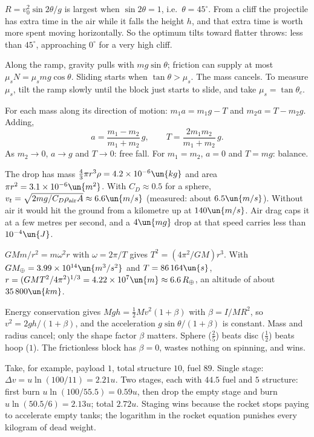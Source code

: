 
 $R = v_0^2\sin2\theta/g$ is largest when $\sin2\theta = 1$, i.e.\ $\theta = 45^\circ$. From a cliff the projectile has extra time in the air while it falls the height $h$, and that extra time is worth more spent moving horizontally. So the optimum tilts toward flatter throws: less than $45^\circ$, approaching $0^\circ$ for a very high cliff.

 Along the ramp, gravity pulls with $mg\sin\theta$; friction can supply at most $\mu_sN = \mu_smg\cos\theta$. Sliding starts when $\tan\theta>\mu_s$. The mass cancels. To measure $\mu_s$, tilt the ramp slowly until the block just starts to slide, and take $\mu_s = \tan\theta_c$.

 For each mass along its direction of motion: $m_1a = m_1g - T$ and $m_2a = T - m_2g$. Adding,
\[
  a = \frac{m_1-m_2}{m_1+m_2}\,g, \qquad T = \frac{2m_1m_2}{m_1+m_2}\,g .
\]
As $m_2\to0$, $a\to g$ and $T\to0$: free fall. For $m_1 = m_2$, $a = 0$ and $T = mg$: balance.

 The drop has mass $\tfrac43\pi r^3\rho = 4.2\times10^{-6}\un{kg}$ and area $\pi r^2 = 3.1\times10^{-6}\un{m^2}$. With $C_D\approx0.5$ for a sphere, $v_t = \sqrt{2mg/C_D\rho_{\text{air}}A}\approx6.6\un{m/s}$ (measured: about $6.5\un{m/s}$). Without air it would hit the ground from a kilometre up at $140\un{m/s}$. Air drag caps it at a few metres per second, and a $4\un{mg}$ drop at that speed carries less than $10^{-4}\un{J}$.

 $GMm/r^2 = m\omega^2r$ with $\omega = 2\pi/T$ gives $T^2 = (4\pi^2/GM)r^3$. With $GM_\oplus = 3.99\times10^{14}\un{m^3/s^2}$ and $T = 86\,164\un{s}$, $r = (GMT^2/4\pi^2)^{1/3} = 4.22\times10^7\un{m}\approx6.6\,R_\oplus$, an altitude of about $35\,800\un{km}$.

 Energy conservation gives $Mgh = \tfrac12Mv^2(1+\beta)$ with $\beta = I/MR^2$, so $v^2 = 2gh/(1+\beta)$, and the acceleration $g\sin\theta/(1+\beta)$ is constant. Mass and radius cancel; only the shape factor $\beta$ matters. Sphere ($\tfrac25$) beats disc ($\tfrac12$) beats hoop ($1$). The frictionless block has $\beta = 0$, wastes nothing on spinning, and wins.

 Take, for example, payload $1$, total structure $10$, fuel $89$. Single stage: $\Delta v = u\ln(100/11) = 2.21u$. Two stages, each with $44.5$ fuel and $5$ structure: first burn $u\ln(100/55.5) = 0.59u$, then drop the empty stage and burn $u\ln(50.5/6) = 2.13u$; total $2.72u$. Staging wins because the rocket stops paying to accelerate empty tanks; the logarithm in the rocket equation punishes every kilogram of dead weight.

